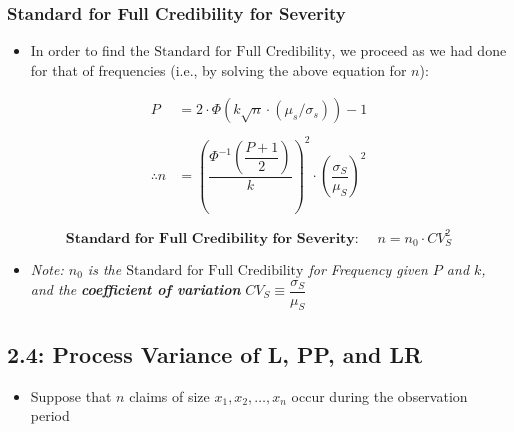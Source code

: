 \documentclass[
]{article}
\providecommand{\tightlist}{%
  \setlength{\itemsep}{0pt}\setlength{\parskip}{0pt}}
\begin{document}
\begin{green}

\hypertarget{standard-for-full-credibility-for-severity}{%
\subsubsection{Standard for Full Credibility for
Severity}\label{standard-for-full-credibility-for-severity}}

\begin{itemize}
\tightlist
\item
  In order to find the \(\text{Standard for Full Credibility}\), we
  proceed as we had done for that of frequencies (i.e., by solving the
  above equation for \(n\)):
\end{itemize}

\[
  \begin{align}   
    P &= 2 \cdot \Phi(k\sqrt{n} \cdot (\mu_s/\sigma_s)) - 1 \\  \\
    \therefore n &= \left(\dfrac{\Phi^{-1}\left( \dfrac{P+1}{2} \right)}{k} \right)^2 \cdot\left( \dfrac{\sigma_S}{\mu_S} \right)^2 \\ \\
  \end{align}
\] \[
  \textbf{Standard for Full Credibility for Severity: } \quad     n = n_0 \cdot CV_S^2
\]

\begin{itemize}
\tightlist
\item
  \emph{Note: \(n_0\) is the \(\text{Standard for Full Credibility}\)
  for Frequency given \(P\) and \(k\), and the}
  \textbf{\emph{coefficient of variation}}
  \emph{\(CV_S \equiv \dfrac{\sigma_S}{\mu_S}\)}
\end{itemize}

\end{green}

\hypertarget{process-variance-of-l-pp-and-lr}{%
\subsection{2.4: Process Variance of L, PP, and
LR}\label{process-variance-of-l-pp-and-lr}}

\begin{itemize}
\tightlist
\item
  Suppose that \(n\) claims of size \(x_1,x_2,\dots,x_n\) occur during
  the observation period
\end{itemize}
\end{document}
